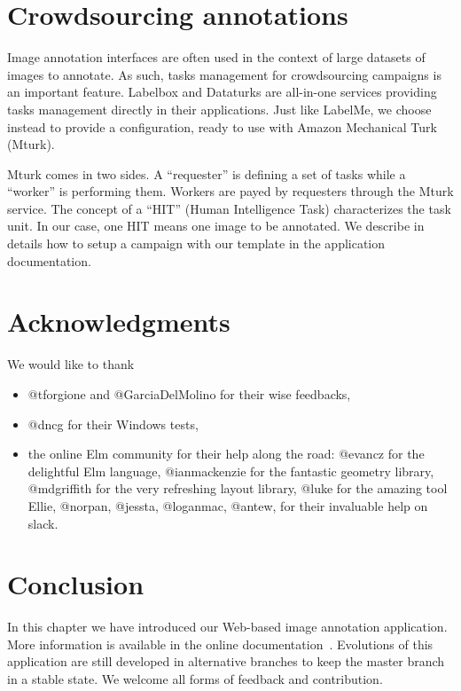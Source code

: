 \section{Crowdsourcing annotations}

Image annotation interfaces are often used in the context
of large datasets of images to annotate.
As such, tasks management for crowdsourcing campaigns is an important feature. 
Labelbox and Dataturks are all-in-one services providing
tasks management directly in their applications.
Just like LabelMe, we choose instead to provide a configuration,
ready to use with Amazon Mechanical Turk (Mturk).

Mturk comes in two sides. A ``requester'' is defining a set of tasks
while a ``worker'' is performing them.
Workers are payed by requesters through the Mturk service.
The concept of a ``HIT'' (Human Intelligence Task) characterizes the task unit.
In our case, one HIT means one image to be annotated.
We describe in details how to setup a campaign with our template
in the application documentation.


\section{Acknowledgments}

We would like to thank

\begin{itemize}
	\item @tforgione and @GarciaDelMolino for their wise feedbacks,
	\item @dncg for their Windows tests,
	\item the online Elm community for their help along the road:
		@evancz for the delightful Elm language,
		@ianmackenzie for the fantastic geometry library,
		@mdgriffith for the very refreshing layout library,
		@luke for the amazing tool Ellie,
		@norpan, @jessta, @loganmac, @antew, for their invaluable help on slack.
\end{itemize}


\section{Conclusion}

In this chapter we have introduced our Web-based image annotation application.
More information is available in the online documentation~\cite{annotationappdoc}.
Evolutions of this application are still developed in alternative branches to keep
the master branch in a stable state. We welcome all forms of feedback and contribution.

